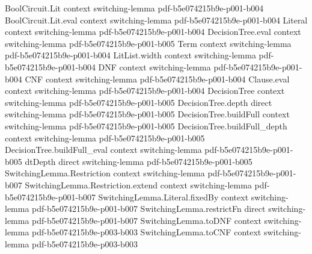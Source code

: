\begin{theorem}
\label{LMN.all_gates_have_small_cnf}
\leanok
{}
\proofstep
  {BoolCircuit.Lit}
  {context}
  {switching-lemma}
  {pdf-b5e074215b9e-p001-b004}
\proofstep
  {BoolCircuit.Lit.eval}
  {context}
  {switching-lemma}
  {pdf-b5e074215b9e-p001-b004}
\proofstep
  {Literal}
  {context}
  {switching-lemma}
  {pdf-b5e074215b9e-p001-b004}
\proofstep
  {DecisionTree.eval}
  {context}
  {switching-lemma}
  {pdf-b5e074215b9e-p001-b005}
\proofstep
  {Term}
  {context}
  {switching-lemma}
  {pdf-b5e074215b9e-p001-b004}
\proofstep
  {LitList.width}
  {context}
  {switching-lemma}
  {pdf-b5e074215b9e-p001-b004}
\proofstep
  {DNF}
  {context}
  {switching-lemma}
  {pdf-b5e074215b9e-p001-b004}
\proofstep
  {CNF}
  {context}
  {switching-lemma}
  {pdf-b5e074215b9e-p001-b004}
\proofstep
  {Clause.eval}
  {context}
  {switching-lemma}
  {pdf-b5e074215b9e-p001-b004}
\proofstep
  {DecisionTree}
  {context}
  {switching-lemma}
  {pdf-b5e074215b9e-p001-b005}
\proofstep
  {DecisionTree.depth}
  {direct}
  {switching-lemma}
  {pdf-b5e074215b9e-p001-b005}
\proofstep
  {DecisionTree.buildFull}
  {context}
  {switching-lemma}
  {pdf-b5e074215b9e-p001-b005}
\proofstep
  {DecisionTree.buildFull_depth}
  {context}
  {switching-lemma}
  {pdf-b5e074215b9e-p001-b005}
\proofstep
  {DecisionTree.buildFull_eval}
  {context}
  {switching-lemma}
  {pdf-b5e074215b9e-p001-b005}
\proofstep
  {dtDepth}
  {direct}
  {switching-lemma}
  {pdf-b5e074215b9e-p001-b005}
\proofstep
  {SwitchingLemma.Restriction}
  {context}
  {switching-lemma}
  {pdf-b5e074215b9e-p001-b007}
\proofstep
  {SwitchingLemma.Restriction.extend}
  {context}
  {switching-lemma}
  {pdf-b5e074215b9e-p001-b007}
\proofstep
  {SwitchingLemma.Literal.fixedBy}
  {context}
  {switching-lemma}
  {pdf-b5e074215b9e-p001-b007}
\proofstep
  {SwitchingLemma.restrictFn}
  {direct}
  {switching-lemma}
  {pdf-b5e074215b9e-p001-b007}
\proofstep
  {SwitchingLemma.toDNF}
  {context}
  {switching-lemma}
  {pdf-b5e074215b9e-p003-b003}
\proofstep
  {SwitchingLemma.toCNF}
  {context}
  {switching-lemma}
  {pdf-b5e074215b9e-p003-b003}
\proofstep

\end{theorem}
